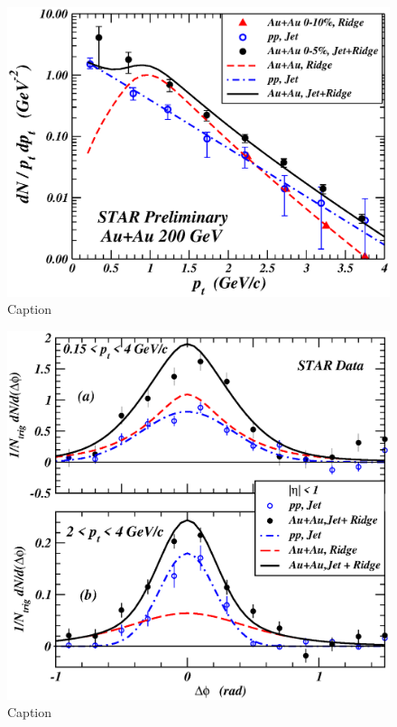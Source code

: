 \documentclass[showpacs,preprintnumbers,amsmath,amssymb,floatfix]{revtex4}
\begin{document}
\begin{figure} [h]
\includegraphics[angle=0,scale=0.50]{pkdendnptdpt}
\vspace*{0.0cm}
\caption{ Caption 
}
\end{figure}


\begin{figure} [h]
\includegraphics[angle=0,scale=0.50]{dndfiPRLfig1}
\vspace*{0.0cm}
\caption{ Caption 
}
\end{figure}
\end{document}
